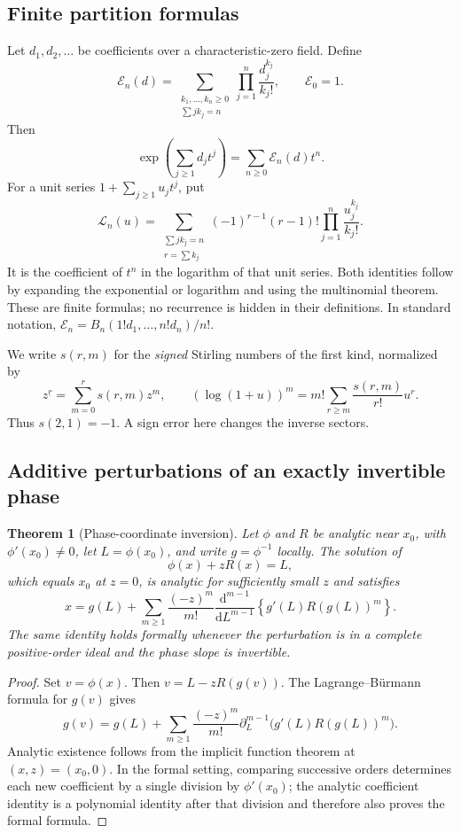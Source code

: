 \documentclass[11pt,a4paper]{article}
\newtheorem{theorem}{Theorem}[section]
\theoremstyle{definition}
\theoremstyle{remark}
\newcommand{\dd}{\mathrm d}
\newcommand{\ExpC}{\mathcal E}
\newcommand{\LogC}{\mathcal L}
\newcommand{\fall}[2]{#1^{\underline{#2}}}
\numberwithin{equation}{section}
\begin{document}
\subsection{Finite partition formulas}
Let $d_1,d_2,\ldots$ be coefficients over a characteristic-zero field. Define
\begin{equation}
 \ExpC_n(d)=
 \sum_{\substack{k_1,\ldots,k_n\ge0\\\sum j k_j=n}}
 \prod_{j=1}^n\frac{d_j^{k_j}}{k_j!},\qquad \ExpC_0=1.
 \label{eq:expcoeff}
\end{equation}
Then
\[
 \exp\!\left(\sum_{j\ge1}d_jt^j\right)=\sum_{n\ge0}\ExpC_n(d)t^n.
\]
For a unit series $1+\sum_{j\ge1}u_jt^j$, put
\begin{equation}
 \LogC_n(u)=
 \sum_{\substack{\sum j k_j=n\\r=\sum k_j}}
 (-1)^{r-1}(r-1)!\prod_{j=1}^n\frac{u_j^{k_j}}{k_j!}.
 \label{eq:logcoeff}
\end{equation}
It is the coefficient of $t^n$ in the logarithm of that unit series. Both identities follow by expanding the exponential or logarithm and using the multinomial theorem. These are finite formulas; no recurrence is hidden in their definitions. In standard notation, $\ExpC_n=B_n(1!d_1,\ldots,n!d_n)/n!$.

We write $s(r,m)$ for the \emph{signed} Stirling numbers of the first kind, normalized by
\begin{equation}
 \fall{z}{r}=\sum_{m=0}^r s(r,m)z^m,
 \qquad
 (\log(1+u))^m=m!\sum_{r\ge m}\frac{s(r,m)}{r!}u^r.
 \label{eq:stirlingsign}
\end{equation}
Thus $s(2,1)=-1$. A sign error here changes the inverse sectors.

\subsection{Additive perturbations of an exactly invertible phase}
\begin{theorem}[Phase-coordinate inversion]
\label{thm:phase}
Let $\phi$ and $R$ be analytic near $x_0$, with $\phi'(x_0)\ne0$, let $L=\phi(x_0)$, and write $g=\phi^{-1}$ locally. The solution of
\[
 \phi(x)+zR(x)=L,
\]
which equals $x_0$ at $z=0$, is analytic for sufficiently small $z$ and satisfies
\begin{equation}
 x=g(L)+\sum_{m\ge1}\frac{(-z)^m}{m!}
 \frac{\dd^{m-1}}{\dd L^{m-1}}
 \left\{g'(L)R(g(L))^m\right\}.
 \label{eq:phaseinv}
\end{equation}
The same identity holds formally whenever the perturbation is in a complete positive-order ideal and the phase slope is invertible.
\end{theorem}
\begin{proof}
Set $v=\phi(x)$. Then $v=L-zR(g(v))$. The Lagrange--B\"urmann formula for $g(v)$ gives
\[
 g(v)=g(L)+\sum_{m\ge1}\frac{(-z)^m}{m!}
 \partial_L^{m-1}\bigl(g'(L)R(g(L))^m\bigr).
\]
Analytic existence follows from the implicit function theorem at $(x,z)=(x_0,0)$. In the formal setting, comparing successive orders determines each new coefficient by a single division by $\phi'(x_0)$; the analytic coefficient identity is a polynomial identity after that division and therefore also proves the formal formula.
\end{proof}
\end{document}
